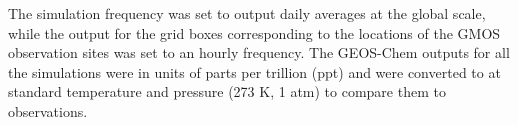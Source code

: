 \begin{table}[H]
\label{tab:geos_chem_simulation_description}

\centering
{}
\end{table}

\begin{flushleft}
 The simulation frequency was set to output daily \hg averages at the global scale, while the \hg output for the grid boxes corresponding to the locations of the GMOS observation sites was set to an hourly frequency. The GEOS-Chem outputs for all the simulations were in units of parts per trillion (ppt) and were converted to \nang at standard temperature and pressure (273 K, 1 atm) to compare them to observations.
\end{flushleft}

